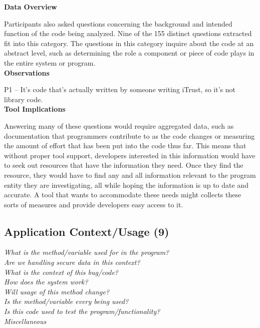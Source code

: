 \documentclass[conference]{IEEEtran}
\begin{document}
\noindent\textbf{Data Overview}

Participants also asked questions concerning the background and intended function of the code being analyzed. 
Nine of the 155 distinct questions extracted fit into this category. 
The questions in this category inquire about the code at an abstract level, such as determining the role a component or piece of code plays in the entire system or program.
\\

\noindent\textbf{Observations}

P1 -- It's code that's actually written by someone writing iTrust, so it's not library code.
\\

\noindent\textbf{Tool Implications}

Answering many of these questions would require aggregated data, such as documentation that programmers contribute to as the code changes or measuring the amount of effort that has been put into the code thus far.
This means that without proper tool support, developers interested in this information would have to seek out resources that have the information they need. 
Once they find the resource, they would have to find any and all information relevant to the program entity they are investigating, all while hoping the information is up to date and accurate. 
A tool that wants to accommodate these needs might collects these sorts of measures and provide developers easy access to it.



\noindent\subsection{\textbf{Application Context/Usage (9)}}\label{acu}

\noindent\emph{What is the method/variable used for in the program?} \\
\emph{Are we handling secure data in this context?} \\
\emph{What is the context of this bug/code?} \\
\emph{How does the system work?} \\
\emph{Will usage of this method change?} \\
\emph{Is the method/variable every being used?} \\
\emph{Is this code used to test the program/functionality?} \\
\emph{Miscellaneous} \\
\end{document}
